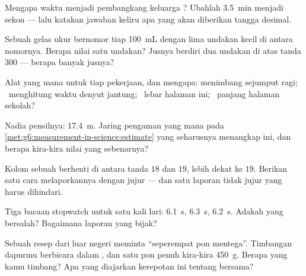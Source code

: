 \begin{exercise}[$\star$]\label{exo:g6:measurement-in-science:3}
Mengapa waktu menjadi pembangkang keluarga ? Ubahlah
\qty{3.5}{min} menjadi sekon --- lalu katakan jawaban keliru apa yang
akan diberikan tangga desimal.
\end{exercise}

\begin{exercise}[$\star$]\label{exo:g6:measurement-in-science:4}
Sebuah gelas ukur bernomor tiap \qty{100}{mL} dengan lima undakan
kecil di antara nomornya. Berapa nilai satu undakan? Jusnya berdiri
dua undakan di atas tanda $300$ --- berapa banyak jusnya?
\end{exercise}

\begin{exercise}[$\star$]\label{exo:g6:measurement-in-science:5}
Alat yang mana untuk tiap pekerjaan, dan mengapa: menimbang sejumput
ragi; \ menghitung waktu denyut jantung; \ lebar halaman ini;
\ panjang halaman sekolah?
\end{exercise}

\begin{exercise}[$\star$]\label{exo:g6:measurement-in-science:6}
Nadia  pensilnya: \qty{17.4}{m}. Jaring pengaman yang mana
pada \cref{met:g6:measurement-in-science:estimate} yang seharusnya
menangkap ini, dan berapa kira-kira nilai yang sebenarnya?
\end{exercise}

\begin{exercise}[$\star$]\label{exo:g6:measurement-in-science:7}
Kolom sebuah  berhenti di antara tanda $18$ dan $19$, lebih
dekat ke $19$. Berikan satu cara melaporkannya dengan jujur --- dan
satu laporan tidak jujur yang harus dihindari.
\end{exercise}

\begin{exercise}[$\star$]\label{exo:g6:measurement-in-science:8}
Tiga bacaan stopwatch untuk satu kali lari: \qty{6.1}{s},
\qty{6.3}{s}, \qty{6.2}{s}. Adakah yang bersalah? Bagaimana laporan
yang bijak?
\end{exercise}

\begin{exercise}[$\star\star$]\label{exo:g6:measurement-in-science:9}
Sebuah resep dari luar negeri meminta ``seperempat pon mentega''.
Timbangan dapurmu berbicara dalam , dan satu pon penuh kira-kira
\qty{450}{g}. Berapa  yang kamu timbang? Apa yang diajarkan
kerepotan ini tentang  bersama?
\end{exercise}

